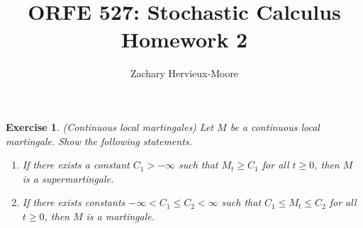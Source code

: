 \documentclass[12pt]{article}
\title{ORFE 527: Stochastic Calculus \\ Homework 2}
\author{Zachary Hervieux-Moore}
\date{\displaydate{date}}
\theoremstyle{colon}
\newtheorem{exercise}{Exercise}
\begin{document}
\maketitle

\clearpage

\begin{exercise}
  (Continuous local martingales) Let $M$ be a continuous local martingale. Show the following statements.
  \begin{enumerate}[label=\alph*)]
      \item If there exists a constant $C_1 > -\infty$ such that $M_t \geq C_1$ for all $t \geq 0$, then $M$ is a supermartingale.
      \item If there exists constants $-\infty < C_1 \leq C_2 < \infty$ such that $C_1 \leq M_t \leq C_2$ for all $t \geq 0$, then $M$ is a martingale.
  \end{enumerate}
\end{exercise}
\end{document}
